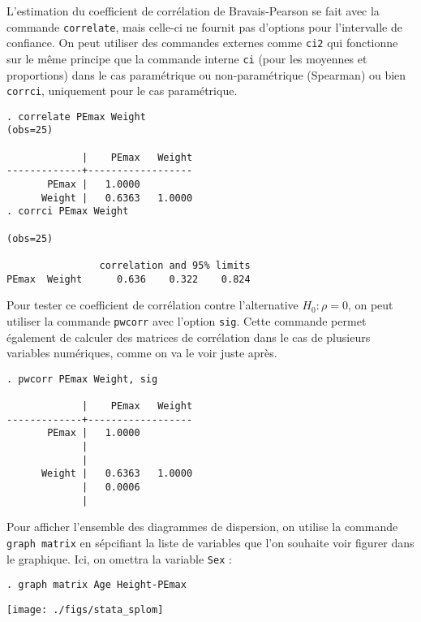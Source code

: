 L'estimation du coefficient de corrélation de Bravais-Pearson se fait avec
la commande \texttt{correlate}, mais celle-ci ne fournit pas d'options pour
l'intervalle de confiance. On peut utiliser des commandes externes comme
\texttt{ci2} qui fonctionne sur le même principe que la commande interne
\texttt{ci} (pour les moyennes et proportions) dans le cas paramétrique ou
non-paramétrique (Spearman) ou bien \texttt{corrci}, uniquement pour le cas
paramétrique. \label{cmd:corrci}
\begin{verbatim}
. correlate PEmax Weight
(obs=25)

             |    PEmax   Weight
-------------+------------------
       PEmax |   1.0000
      Weight |   0.6363   1.0000
. corrci PEmax Weight

(obs=25)

                correlation and 95% limits
PEmax  Weight      0.636    0.322    0.824
\end{verbatim}

Pour tester ce coefficient de corrélation contre l'alternative $H_0:
\rho=0$, on peut utiliser la commande \verb|pwcorr| avec l'option
\verb|sig|. Cette commande permet également de calculer des matrices de
corrélation dans le cas de plusieurs variables numériques, comme on va le
voir juste après.
\begin{verbatim}
. pwcorr PEmax Weight, sig

             |    PEmax   Weight
-------------+------------------
       PEmax |   1.0000 
             |
             |
      Weight |   0.6363   1.0000 
             |   0.0006
             |
\end{verbatim}

Pour afficher l'ensemble des diagrammes de dispersion, on utilise la
commande \texttt{graph matrix} en sépcifiant la liste de variables que l'on
souhaite voir figurer dans le graphique. Ici, on omettra la variable
\texttt{Sex} : 
\begin{verbatim}
. graph matrix Age Height-PEmax
\end{verbatim}

\texttt{[image: ./figs/stata\_splom]}

